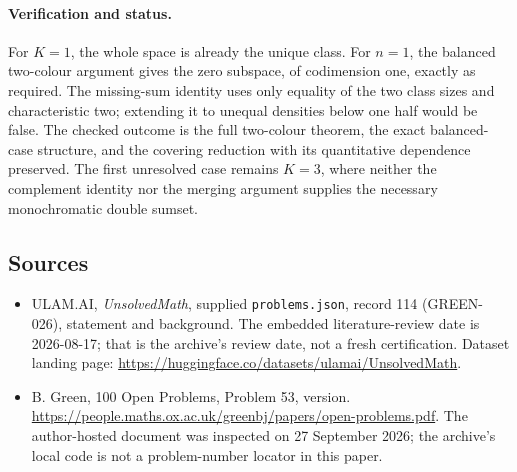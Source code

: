 \documentclass[11pt,a4paper]{article}
\begin{document}
\paragraph{Verification and status.}
For $K=1$, the whole space is already the unique class. For $n=1$, the balanced two-colour argument gives the zero subspace, of codimension one, exactly as required. The missing-sum identity uses only equality of the two class sizes and characteristic two; extending it to unequal densities below one half would be false. The checked outcome is the full two-colour theorem, the exact balanced-case structure, and the covering reduction with its quantitative dependence preserved. The first unresolved case remains $K=3$, where neither the complement identity nor the merging argument supplies the necessary monochromatic double sumset.

\subsection{Sources}

{\small

\begin{itemize}

\item[\hypertarget{source:114:1}{S1}] ULAM.AI, \emph{UnsolvedMath}, supplied \texttt{problems.json}, record 114 (GREEN-026), statement and background. The embedded literature-review date is 2026-08-17; that is the archive’s review date, not a fresh certification. Dataset landing page: \url{https://huggingface.co/datasets/ulamai/UnsolvedMath}.

\item[\hypertarget{source:114:2}{S2}] B. Green, 100 Open Problems, Problem 53, version. \url{https://people.maths.ox.ac.uk/greenbj/papers/open-problems.pdf}. The author-hosted document was inspected on 27 September 2026; the archive’s local code is not a problem-number locator in this paper.

\end{itemize}

}

\label{end:114}
\end{document}
